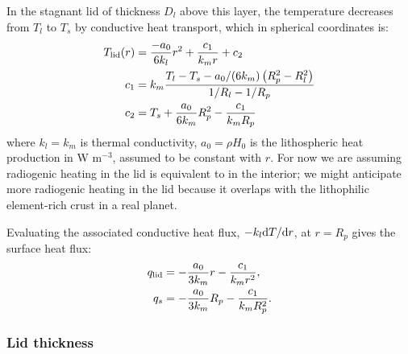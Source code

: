 In the stagnant lid of thickness $D_l$ above this layer, the temperature decreases from $T_l$ to $T_s$ by conductive heat transport, which in spherical coordinates is:
\begin{align}
T_{\rm lid}(r) &= \frac{-a_0}{6k_l} r^2 + \frac{c_1}{k_m r} + c_2 \\
    c_1 &= k_m \frac{T_l - T_s - a_0/(6 k_m) \left(R_p^2 - R_l^2\right)}{1/R_l - 1/R_p} \\
    c_2 &= T_s + \frac{a_0}{6 k_m} R_p^2 - \frac{c_1}{k_m R_p}
\end{align} 
where $k_l = k_m$ is thermal conductivity, $a_0 = \rho H_0$ is the lithospheric heat production in W m$^{-3}$, assumed to be constant with $r$. For now we are assuming radiogenic heating in the lid is equivalent to in the interior; we might anticipate more radiogenic heating in the lid because it overlaps with the lithophilic element-rich crust in a real planet.

Evaluating the associated conductive heat flux, $-k_l \mathrm{d} T/\mathrm{d} r$, at $r = R_p$ gives the surface heat flux:
\begin{align}
q_{\rm lid} &= -\frac{a_0}{3k_m}r - \frac{c_1}{k_m r^2},\\
q_{s} &= -\frac{a_0}{3k_m}R_p - \frac{c_1}{k_m R_p^2}.
\end{align}



\subsubsection{Lid thickness}

%


